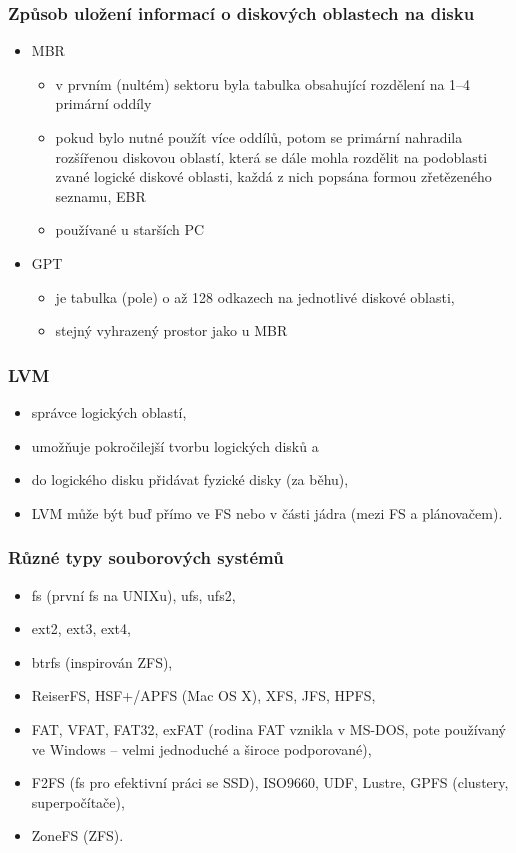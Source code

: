 \documentclass[a4paper, 11pt]{article}
\begin{document}
\subsubsection{Způsob uložení informací o diskových oblastech na disku}
\begin{itemize}
    \item MBR
    \begin{itemize}
        \item v prvním (nultém) sektoru byla tabulka obsahující rozdělení na 1--4 primární oddíly
        \item pokud bylo nutné použít více oddílů, potom se primární nahradila rozšířenou diskovou oblastí, která se dále mohla rozdělit na podoblasti zvané logické diskové oblasti, každá z nich popsána formou zřetězeného seznamu, EBR
        \item používané u starších PC
    \end{itemize}
    \item GPT
    \begin{itemize}
        \item je tabulka (pole) o až 128 odkazech na jednotlivé diskové oblasti,
        \item stejný vyhrazený prostor jako u MBR
    \end{itemize}
\end{itemize}

\subsubsection{LVM}
\begin{itemize}
    \item správce logických oblastí,
    \item umožňuje pokročilejší tvorbu logických disků a
    \item do logického disku přidávat fyzické disky (za běhu),
    \item LVM může být buď přímo ve FS nebo v části jádra (mezi FS a plánovačem).
\end{itemize}

\subsubsection{Různé typy souborových systémů}
\begin{itemize}
    \item fs (první fs na UNIXu), ufs, ufs2,
    \item ext2, ext3, ext4,
    \item btrfs (inspirován ZFS),
    \item ReiserFS, HSF+/APFS (Mac OS X), XFS, JFS, HPFS,
    \item FAT, VFAT, FAT32, exFAT (rodina FAT vznikla v MS-DOS, pote používaný ve Windows -- velmi jednoduché a široce podporované),
    \item F2FS (fs pro efektivní práci se SSD), ISO9660, UDF, Lustre, GPFS (clustery, superpočítače),
    \item ZoneFS (ZFS).
\end{itemize}
\end{document}
